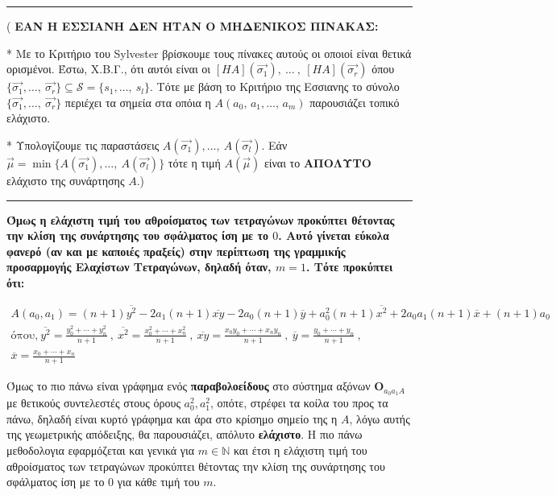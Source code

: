 \documentclass[12pt]{article}
\begin{document}
\begin{center}\rule{0.5\linewidth}{0.5pt}\end{center}

({ \textbf{EAN Η ΕΣΣΙΑΝΗ ΔΕΝ ΗΤΑΝ Ο ΜΗΔΕΝΙΚΟΣ ΠΙΝΑΚΑΣ:}}

{* Mε το Κριτήριο του Sylvester βρίσκουμε τους πίνακες αυτούς οι οποιοί
είναι θετικά ορισμένοι. Έστω, Χ.Β.Γ., ότι αυτόι είναι οι
\([HA](\vec{\sigma_1}), \ \dots \ , \  [HA](\vec{\sigma_r})\) όπου
\(\{ \vec{\sigma_1}, \dots, \ \vec{\sigma_r} \} \subseteq \mathcal{S} = \{s_1, \dots, \ s_l\}\).
Tότε με βάση το Κριτήριο της Εσσιανης το σύνολο
\(\{ \vec{\sigma_1}, \dots, \ \vec{\sigma_r} \}\) περιέχει τα σημεία στα
οπόια η \(A(a_0, \, a_1,\dots, \, a_m)\) παρουσιάζει τοπικό ελάχιστο.}

{* Υπολογίζουμε τις παραστάσεις
\(A(\vec{\sigma_1}), \dots, \ A(\vec{\sigma_l})\). Εάν
\(\vec{\mu} = \min \{ A(\vec{\sigma_1}), \dots, \ A(\vec{\sigma_l}) \}\)
τότε η τιμή \(Α(\vec{\mu})\) είναι το \textbf{ΑΠΟΛΥΤΟ} ελάχιστο της
συνάρτησης \(A\).) }

\begin{center}\rule{0.5\linewidth}{0.5pt}\end{center}

\textbf{Όμως η ελάχιστη τιμή του αθροίσματος των τετραγώνων προκύπτει
θέτοντας την κλίση της συνάρτησης του σφάλματος ίση με το \(0\). Αυτό
γίνεται εύκολα φανερό (αν και με καποιές πραξείς) στην περίπτωση της
γραμμικής προσαρμογής Ελαχίστων Τετραγώνων, δηλαδή όταν, \(m=1\). Τότε
προκύπτει ότι:}

\begin{gather*}
A(a_0,a_1)=(n+1)\overline{y^2}-2a_1(n+1)\overline{xy}-2a_0(n+1)\overline{y}+a_0^2(n+1)\overline{x^2}+2a_0a_1(n+1)\overline{x}+(n+1)a_0 \\
\text{όπου,} \ \overline{y^2}=\frac{y_0^2+\cdots+y_n^2}{n+1} \ , \ \overline{x^2}=\frac{x_0^2+\cdots+x_n^2}{n+1} \ , \ \overline{xy}=\frac{x_0y_0+\cdots+x_ny_n}{n+1} \ , \ \overline{y}=\frac{y_0+\cdots+y_n}{n+1} \ , \\ \overline{x}=\frac{x_0+\cdots+x_n}{n+1}
\end{gather*} %

Όμως το πιο πάνω είναι γράφημα ενός \textbf{παραβολοείδους} στο σύστημα
αξόνων \(\mathbf{O}_{a_0a_1A}\) με θετικούς συντελεστές στους όρους
\(a_0^2, a_1^2\), οπότε, στρέφει τα κοίλα του προς τα πάνω, δηλαδή είναι
κυρτό γράφημα και άρα στο κρίσημο σημείο της η \(A\), λόγω αυτής της
γεωμετρικής απόδειξης, θα παρουσιάζει, απόλυτο \textbf{ελάχιστο}. Η πιο
πάνω μεθοδολογια εφαρμόζεται και γενικά για \(m \in \mathbb{N}\) και
έτσι η ελάχιστη τιμή του αθροίσματος των τετραγώνων προκύπτει θέτοντας
την κλίση της συνάρτησης του σφάλματος ίση με το \(0\) για κάθε τιμή του
\(m\).
\end{document}
